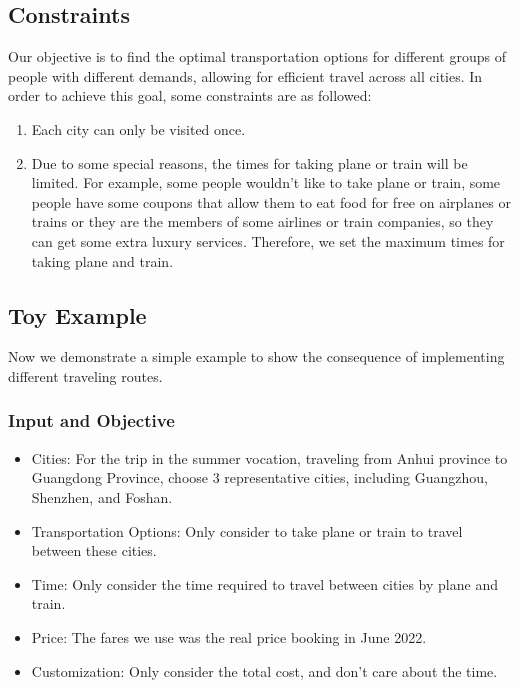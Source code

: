 \documentclass{extarticle}
\begin{document}
\subsection{Constraints}

Our objective is to find the optimal transportation options for different
groups of people with different demands, allowing for efficient travel across
all cities. In order to achieve this goal, some constraints are as followed:

\begin{enumerate}
  \item Each city can only be visited once.
  \item Due to some special reasons, the times for taking plane or train will be
        limited. For example, some people wouldn't like to take plane or train, some
        people have some coupons that allow them to eat food for free on airplanes or
        trains or they are the members of some airlines or train companies, so they can
        get some extra luxury services. Therefore, we set the maximum times for taking
        plane and train.
\end{enumerate}

\subsection{Toy Example}

Now we demonstrate a simple example to show the consequence of implementing different traveling routes.

\subsubsection{Input and Objective}
\begin{itemize}
  \item Cities: For the trip in the summer vocation, traveling from Anhui province to
        Guangdong Province, choose 3 representative cities, including Guangzhou,
        Shenzhen, and Foshan.
  \item Transportation Options: Only consider to take plane or train to travel between
        these cities.
  \item Time: Only consider the time required to travel between cities by plane and
        train.
  \item Price: The fares we use was the real price booking in June 2022.
  \item Customization: Only consider the total cost, and don't care about the time.
\end{itemize}
\end{document}
